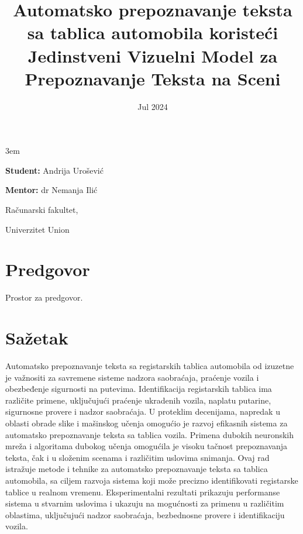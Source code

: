 \documentclass[a4paper,12pt]{article}
\title{Automatsko prepoznavanje teksta sa tablica automobila koristeći Jedinstveni Vizuelni Model za Prepoznavanje Teksta na Sceni}
\date{}
\begin{document}
	\emergencystretch 3em
	\begin{titlepage}
		\centering
		{\huge\bfseries \maketitle}
		
		{\large
			\textbf{Student:}
			Andrija Urošević
			\par
			\bigskip
			\textbf{Mentor:}
			dr Nemanja Ilić
		}
	
		\vfill
		{\large Računarski fakultet,\par}
		{\large Univerzitet Union\par}
		\bigskip
		\date{Jul 2024}
	\end{titlepage}
	
	
	\section*{Predgovor}
	Prostor za predgovor.
	\newpage
	
	\tableofcontents
	\newpage
	
	
	\section*{Sažetak}
	\noindent
	Automatsko prepoznavanje teksta sa registarskih tablica automobila od izuzetne je važnositi za savremene sisteme nadzora saobraćaja, praćenje vozila i obezbeđenje sigurnosti na putevima. Identifikacija registarskih tablica ima različite primene, uključujući praćenje ukradenih vozila, naplatu putarine, sigurnosne provere i nadzor saobraćaja. U proteklim decenijama, napredak u oblasti obrade slike i mašinskog učenja omogućio je razvoj efikasnih sistema za automatsko prepoznavanje teksta sa tablica vozila. Primena dubokih neuronskih mreža i algoritama dubokog učenja omogućila je visoku tačnost prepoznavanja teksta, čak i u složenim scenama i različitim uslovima snimanja. Ovaj rad istražuje metode i tehnike za automatsko prepoznavanje teksta sa tablica automobila, sa ciljem razvoja sistema koji može precizno identifikovati registarske tablice u realnom vremenu. Eksperimentalni rezultati prikazuju performanse sistema u stvarnim uslovima i ukazuju na mogućnosti za primenu u različitim oblastima, uključujući nadzor saobraćaja, bezbednosne provere i identifikaciju vozila.
	\newpage
	
\end{document}
